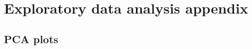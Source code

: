 \documentclass[a4paper,12pt]{article}
\begin{document}
\section{Exploratory data analysis appendix}

\subsection{PCA plots}


















\end{document}
